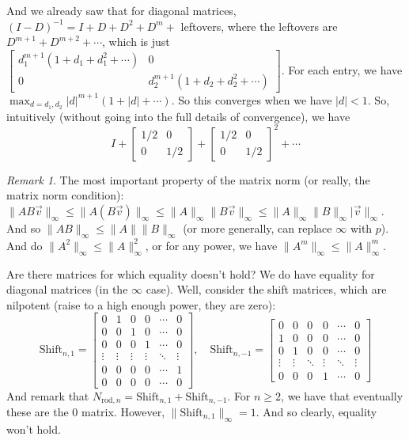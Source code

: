 \documentclass{article}
\theoremstyle{plain}
\theoremstyle{remark}
\newtheorem{remark}{Remark}
\begin{document}
And we already saw that for diagonal matrices,
$(I-D)^{-1} = I + D + D^2 + D^m + $ leftovers,
where the leftovers are $D^{m+1} + D^{m+2} + \cdots$,
which is just $\begin{bmatrix} d_1^{m+1}(1 + d_1 + d_1^2 + \cdots) & 0\\
0 & d_2^{m+1}(1 + d_2 + d_2^2 + \cdots) \end{bmatrix}$.
For each entry, we have $\max_{d = d_1,d_2} |d|^{m+1}(1 + |d| + \cdots)$.
So this converges when we have $|d| < 1$.
So, intuitively (without going into the full details of convergence), we have
\[
	I + \begin{bmatrix} 1/2 & 0 \\ 0 & 1/2 \end{bmatrix}
	+\begin{bmatrix} 1/2 & 0 \\ 0 & 1/2 \end{bmatrix}^2 + \cdots
\]
\begin{remark}
	The most important property of the matrix norm
	(or really, the matrix norm condition):
	$\lVert AB \vec{v} \rVert_\infty \leq \lVert A(B\vec{v})\rVert_\infty
	\leq \lVert A \rVert_\infty \lVert B\vec{v}\rVert_\infty
	\leq \lVert A \rVert_\infty \lVert B \rVert_\infty \lvert \vec{v}\rVert_\infty$.
	And so $\lVert AB \rVert_\infty \leq \lVert A \rVert \lVert B \rVert_\infty$
	(or more generally, can replace $\infty$ with $p$).
	And do $\lVert A^2 \rVert_\infty \leq \lVert A \rVert_\infty^2$,
	or for any power, we have $\lVert A^m \rVert_\infty \leq \lVert A \rVert_\infty^m$.
\end{remark}
Are there matrices for which equality doesn't hold?
We do have equality for diagonal matrices (in the $\infty$ case).
Well, consider the shift matrices, which are nilpotent
(raise to a high enough power, they are zero):
\[
	\mathrm{Shift}_{n,1}
	= \begin{bmatrix} 0 & 1 & 0 & 0 & \cdots & 0\\
		0 & 0 & 1 & 0 & \cdots & 0\\
		0 & 0 & 0 & 1 & \cdots & 0\\
		\vdots & \vdots & \vdots & \vdots & \ddots & \vdots\\
		0 & 0 & 0 & 0 & \cdots & 1\\
		0 & 0 & 0 & 0 & \cdots & 0
	\end{bmatrix}
	,\quad
	\mathrm{Shift}_{n,-1}
	= \begin{bmatrix} 0 & 0 & 0 & 0 & \cdots & 0\\
		1 & 0 & 0 & 0 & \cdots & 0\\
		0 & 1 & 0 & 0 & \cdots & 0\\
		\vdots & \vdots & \ddots & \vdots & \ddots & \vdots\\
		0 & 0 & 0 & 1 & \cdots & 0
	\end{bmatrix}
\]
And remark that $N_{\text{rod},n} = \mathrm{Shift}_{n,1} + \mathrm{Shift}_{n,-1}$.
For $n \geq 2$, we have that eventually these are the $0$ matrix.
However, $\lVert \mathrm{Shift}_{n,1} \rVert_\infty = 1$.
And so clearly, equality won't hold.
\end{document}
